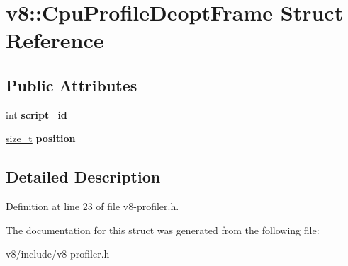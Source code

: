 \hypertarget{structv8_1_1CpuProfileDeoptFrame}{}\section{v8\+:\+:Cpu\+Profile\+Deopt\+Frame Struct Reference}
\label{structv8_1_1CpuProfileDeoptFrame}
\subsection*{Public Attributes}
\begin{DoxyCompactItemize}
\item 
\mbox{\label{structv8_1_1CpuProfileDeoptFrame_af7b750288458a70a81b4c05869b8f6d7}} 
\mbox{\hyperlink{classint}{int}} {\bfseries script\+\_\+id}
\item 
\mbox{\label{structv8_1_1CpuProfileDeoptFrame_a4f82d1517fd15573bb2890961496a76f}} 
\mbox{\hyperlink{classsize__t}{size\+\_\+t}} {\bfseries position}
\end{DoxyCompactItemize}


\subsection{Detailed Description}


Definition at line 23 of file v8-\/profiler.\+h.



The documentation for this struct was generated from the following file\+:\begin{DoxyCompactItemize}
\item 
v8/include/v8-\/profiler.\+h\end{DoxyCompactItemize}
